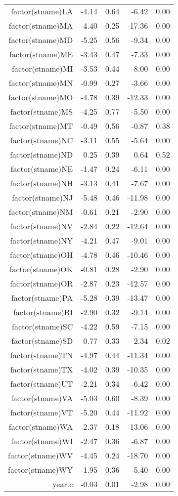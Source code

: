 \begin{table}[ht]
\begin{tabular}{rrrrr}
  factor(stname)LA & -4.14 & 0.64 & -6.42 & 0.00 \\ 
  factor(stname)MA & -4.40 & 0.25 & -17.36 & 0.00 \\ 
  factor(stname)MD & -5.25 & 0.56 & -9.34 & 0.00 \\ 
  factor(stname)ME & -3.43 & 0.47 & -7.33 & 0.00 \\ 
  factor(stname)MI & -3.53 & 0.44 & -8.00 & 0.00 \\ 
  factor(stname)MN & -0.99 & 0.27 & -3.66 & 0.00 \\ 
  factor(stname)MO & -4.78 & 0.39 & -12.33 & 0.00 \\ 
  factor(stname)MS & -4.25 & 0.77 & -5.50 & 0.00 \\ 
  factor(stname)MT & -0.49 & 0.56 & -0.87 & 0.38 \\ 
  factor(stname)NC & -3.11 & 0.55 & -5.64 & 0.00 \\ 
  factor(stname)ND & 0.25 & 0.39 & 0.64 & 0.52 \\ 
  factor(stname)NE & -1.47 & 0.24 & -6.11 & 0.00 \\ 
  factor(stname)NH & -3.13 & 0.41 & -7.67 & 0.00 \\ 
  factor(stname)NJ & -5.48 & 0.46 & -11.98 & 0.00 \\ 
  factor(stname)NM & -0.61 & 0.21 & -2.90 & 0.00 \\ 
  factor(stname)NV & -2.84 & 0.22 & -12.64 & 0.00 \\ 
  factor(stname)NY & -4.21 & 0.47 & -9.01 & 0.00 \\ 
  factor(stname)OH & -4.78 & 0.46 & -10.46 & 0.00 \\ 
  factor(stname)OK & -0.81 & 0.28 & -2.90 & 0.00 \\ 
  factor(stname)OR & -2.87 & 0.23 & -12.57 & 0.00 \\ 
  factor(stname)PA & -5.28 & 0.39 & -13.47 & 0.00 \\ 
  factor(stname)RI & -2.90 & 0.32 & -9.14 & 0.00 \\ 
  factor(stname)SC & -4.22 & 0.59 & -7.15 & 0.00 \\ 
  factor(stname)SD & 0.77 & 0.33 & 2.34 & 0.02 \\ 
  factor(stname)TN & -4.97 & 0.44 & -11.34 & 0.00 \\ 
  factor(stname)TX & -4.02 & 0.39 & -10.35 & 0.00 \\ 
  factor(stname)UT & -2.21 & 0.34 & -6.42 & 0.00 \\ 
  factor(stname)VA & -5.03 & 0.60 & -8.39 & 0.00 \\ 
  factor(stname)VT & -5.20 & 0.44 & -11.92 & 0.00 \\ 
  factor(stname)WA & -2.37 & 0.18 & -13.06 & 0.00 \\ 
  factor(stname)WI & -2.47 & 0.36 & -6.87 & 0.00 \\ 
  factor(stname)WV & -4.45 & 0.24 & -18.70 & 0.00 \\ 
  factor(stname)WY & -1.95 & 0.36 & -5.40 & 0.00 \\ 
  year.c & -0.03 & 0.01 & -2.98 & 0.00 \\ 
   \hline
\end{tabular}
\end{table}
